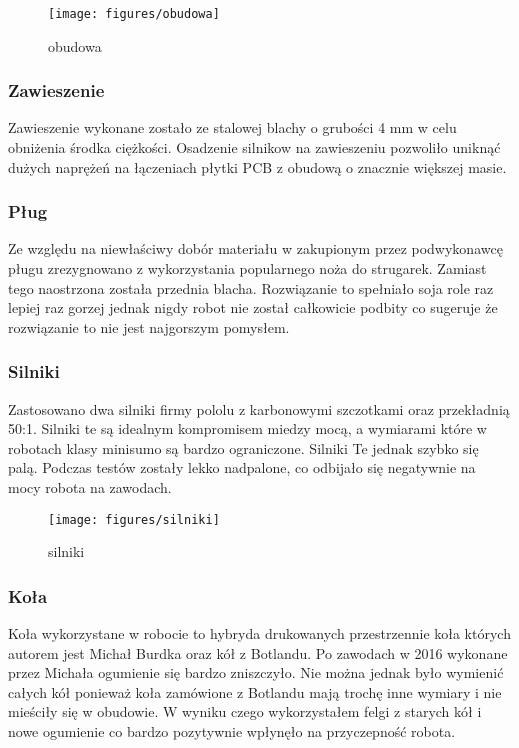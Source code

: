 \documentclass[12pt,a4paper]{article}
\begin{document}
\begin{figure}[!]
\centering
\texttt{[image: figures/obudowa]}
\caption{obudowa  \label{fig:STM}}
\end{figure}

\subsubsection{Zawieszenie}
Zawieszenie wykonane zostało ze stalowej blachy o grubości 4 mm w celu
obniżenia środka ciężkości. Osadzenie silnikow na zawieszeniu pozwoliło
uniknąć dużych naprężeń na łączeniach płytki PCB z obudową o znacznie
większej masie.


\subsubsection{Pług}
Ze względu na niewłaściwy dobór materiału w zakupionym przez podwykonawcę
pługu zrezygnowano z wykorzystania popularnego noża do strugarek. Zamiast tego naostrzona została przednia blacha. Rozwiązanie to spełniało soja role raz lepiej raz gorzej jednak nigdy robot nie został całkowicie podbity co sugeruje że rozwiązanie to nie jest najgorszym pomysłem.

\subsubsection{Silniki}
Zastosowano dwa silniki firmy pololu z karbonowymi szczotkami oraz przekładnią
50:1. Silniki te są idealnym kompromisem miedzy mocą, a wymiarami
które w robotach klasy minisumo są bardzo ograniczone. Silniki Te jednak szybko się palą. Podczas testów zostały lekko nadpalone, co odbijało się negatywnie na mocy robota na zawodach.

\begin{figure}[!]
\centering
\texttt{[image: figures/silniki]}
\caption{silniki  \label{fig:STM}}
\end{figure}

\subsubsection{Koła}
Koła wykorzystane w robocie to hybryda drukowanych przestrzennie koła których autorem
jest Michał Burdka oraz kół z Botlandu. Po zawodach w 2016 wykonane przez Michała ogumienie się bardzo zniszczyło. Nie można jednak było wymienić całych kół ponieważ koła zamówione z Botlandu mają trochę inne wymiary i nie mieściły się w obudowie. W wyniku czego wykorzystałem felgi z starych kół i nowe ogumienie co bardzo pozytywnie wpłynęło na przyczepność robota.
\end{document}

